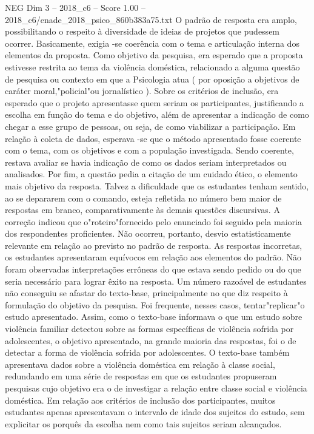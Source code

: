 \begin{textsample}{NEG Dim 3 – 2018\_c6 – Score 1.00 – 2018\_c6/enade\_2018\_psico\_860b383a75.txt}
O padrão de resposta era amplo, possibilitando o respeito à diversidade de ideias de projetos que pudessem ocorrer.
Basicamente, exigia -se coerência com o tema e articulação interna dos elementos da proposta.
Como objetivo da pesquisa, era esperado que a proposta estivesse restrita ao tema da violência doméstica, relacionado a alguma questão de pesquisa ou contexto em que a Psicologia atua ( por oposição a objetivos de caráter moral,"policial"ou jornalístico ).
Sobre os critérios de inclusão, era esperado que o projeto apresentasse quem seriam os participantes, justificando a escolha em função do tema e do objetivo, além de apresentar a indicação de como chegar a esse grupo de pessoas, ou seja, de como viabilizar a participação.
Em relação à coleta de dados, esperava -se que o método apresentado fosse coerente com o tema, com os objetivos e com a população investigada.
Sendo coerente, restava avaliar se havia indicação de como os dados seriam interpretados ou analisados.
Por fim, a questão pedia a citação de um cuidado ético, o elemento mais objetivo da resposta.
Talvez a dificuldade que os estudantes tenham sentido, ao se depararem com o comando, esteja refletida no número bem maior de respostas em branco, comparativamente às demais questões discursivas.
A correção indicou que o"roteiro"fornecido pelo enunciado foi seguido pela maioria dos respondentes proficientes.
Não ocorreu, portanto, desvio estatisticamente relevante em relação ao previsto no padrão de resposta.
As respostas incorretas, os estudantes apresentaram equívocos em relação aos elementos do padrão.
Não foram observadas interpretações errôneas do que estava sendo pedido ou do que seria necessário para lograr êxito na resposta.
Um número razoável de estudantes não conseguiu se afastar do texto-base, principalmente no que diz respeito à formulação do objetivo da pesquisa.
Foi frequente, nesses casos, tentar"replicar"o estudo apresentado.
Assim, como o texto-base informava o que um estudo sobre violência familiar detectou sobre as formas específicas de violência sofrida por adolescentes, o objetivo apresentado, na grande maioria das respostas, foi o de detectar a forma de violência sofrida por adolescentes.
O texto-base também apresentava dados sobre a violência doméstica em relação à classe social, redundando em uma série de respostas em que os estudantes propuseram pesquisas cujo objetivo era o de investigar a relação entre classe social e violência doméstica.
Em relação aos critérios de inclusão dos participantes, muitos estudantes apenas apresentavam o intervalo de idade dos sujeitos do estudo, sem explicitar os porquês da escolha nem como tais sujeitos seriam alcançados.

\end{textsample}
